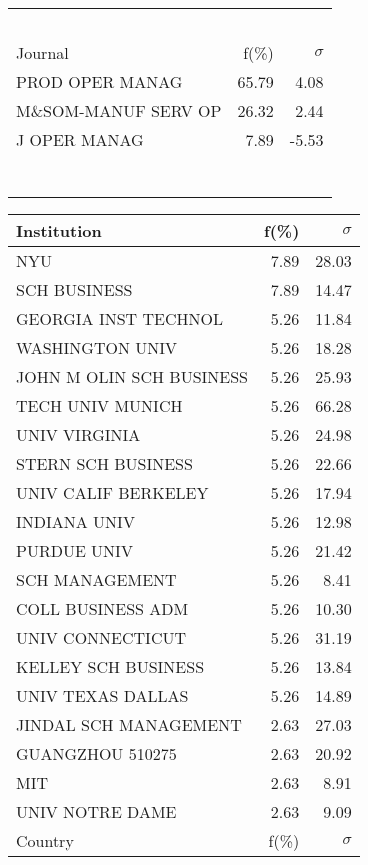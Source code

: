 \documentclass[a4paper,11pt]{report}
\begin{document}
\begin{landscape}
\begin{table}[!ht]
{\begin{tabular}{|l r  r|}
 &  & \\
 &  & \\
 &  & \\
 &  & \\
 &  & \\
\hline
\hline
Journal & f(\%) & $\sigma$\\
\hline
PROD OPER MANAG & 65.79 & 4.08\\
M\&SOM-MANUF SERV OP & 26.32 & 2.44\\
J OPER MANAG & 7.89 & -5.53\\
 &  & \\
 &  & \\
 &  & \\
 &  & \\
 &  & \\
 &  & \\
 &  & \\
\hline
\end{tabular}
}
{\scriptsize\begin{tabular}{|l r r|}
\hline
Institution & f(\%) & $\sigma$\\
\hline
NYU & 7.89 & 28.03\\
SCH BUSINESS & 7.89 & 14.47\\
GEORGIA INST TECHNOL & 5.26 & 11.84\\
WASHINGTON UNIV & 5.26 & 18.28\\
JOHN M OLIN SCH BUSINESS & 5.26 & 25.93\\
TECH UNIV MUNICH & 5.26 & 66.28\\
UNIV VIRGINIA & 5.26 & 24.98\\
STERN SCH BUSINESS & 5.26 & 22.66\\
UNIV CALIF BERKELEY & 5.26 & 17.94\\
INDIANA UNIV & 5.26 & 12.98\\
PURDUE UNIV & 5.26 & 21.42\\
SCH MANAGEMENT & 5.26 & 8.41\\
COLL BUSINESS ADM & 5.26 & 10.30\\
UNIV CONNECTICUT & 5.26 & 31.19\\
KELLEY SCH BUSINESS & 5.26 & 13.84\\
UNIV TEXAS DALLAS & 5.26 & 14.89\\
JINDAL SCH MANAGEMENT & 2.63 & 27.03\\
GUANGZHOU 510275 & 2.63 & 20.92\\
MIT & 2.63 & 8.91\\
UNIV NOTRE DAME & 2.63 & 9.09\\
\hline
\hline
Country & f(\%) & $\sigma$\\

\end{tabular}}
\end{table}
\end{landscape}
\end{document}
